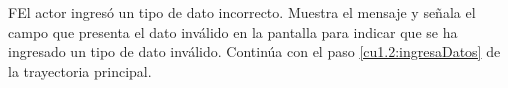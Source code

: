  \begin{UCtrayectoriaA}{F}{El actor ingresó un tipo de dato incorrecto.}
    \UCpaso[\UCsist] Muestra el mensaje  y señala el campo que presenta el dato inválido en la 
    pantalla  para indicar que se ha ingresado un tipo de dato inválido.
    \UCpaso[] Continúa con el paso \ref{cu1.2:ingresaDatos} de la trayectoria principal.
 \end{UCtrayectoriaA}